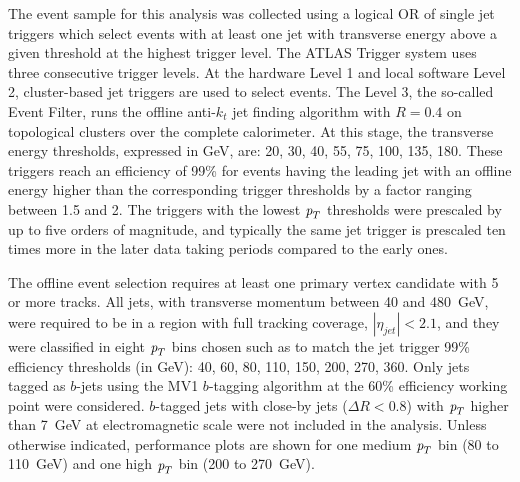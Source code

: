 
The event sample for this analysis was collected  using a logical OR of single jet triggers which select events with at least one jet with transverse energy above a given threshold at the highest trigger level. The ATLAS Trigger system uses three consecutive trigger levels. At the hardware Level 1 and local software Level 2, cluster-based jet triggers are used to select events. The Level 3, the so-called Event Filter, runs  the offline anti-$k_t$ jet finding algorithm with $R = 0.4$ on topological clusters over the complete calorimeter.  At this stage, the transverse energy thresholds, expressed in GeV, are: 20, 30, 40, 55, 75, 100, 135, 180. These triggers reach an efficiency of 99\% for events having the leading jet with an offline energy higher than the corresponding trigger thresholds by a factor ranging between 1.5 and 2. The triggers with the lowest ${\emph{p}_{T}}$ thresholds were prescaled by up to five orders of magnitude, and typically the same jet trigger is prescaled ten times more in the later data taking periods compared to the early ones. %



The offline event selection requires at least one primary vertex candidate with 5 or more tracks. All jets, with transverse momentum between 40 and 480~GeV,  %
were required to be in a region with full tracking coverage, $|\eta_{jet}|<2.1$, and they were classified in eight ${\emph{p}_{T}}$ bins chosen such as to match the jet trigger 99\% efficiency thresholds (in GeV): 40, 60, 80, 110, 150, 200, 270, 360.  %
 Only jets tagged as $b$-jets using the MV1 $b$-tagging algorithm at the 60\% efficiency working point were considered. $b$-tagged jets with close-by jets ($\Delta R < 0.8$) with ${\emph{p}_{T}}$ higher than 7~GeV at electromagnetic scale were not included in the analysis. Unless otherwise indicated, performance plots are shown for one medium  ${\emph{p}_{T}}$ bin (80 to 110~GeV) and one high ${\emph{p}_{T}}$ bin (200 to 270~GeV).


